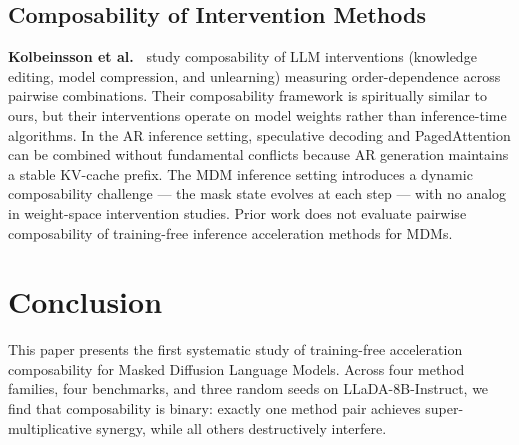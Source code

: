 \documentclass{article}
\begin{document}
\subsection{Composability of Intervention Methods}

\textbf{Kolbeinsson et al.~\cite{kolbeinsson2024composable}} study composability of LLM
interventions (knowledge editing, model compression, and unlearning) measuring order-dependence
across pairwise combinations. Their composability framework is spiritually similar to ours, but
their interventions operate on model weights rather than inference-time algorithms. In the AR
inference setting, speculative decoding and PagedAttention can be combined without fundamental
conflicts because AR generation maintains a stable KV-cache prefix. The MDM inference setting
introduces a dynamic composability challenge --- the mask state evolves at each step --- with no
analog in weight-space intervention studies. Prior work does not evaluate pairwise composability of
training-free inference acceleration methods for MDMs.

\section{Conclusion}
\label{sec:conclusion}

This paper presents the first systematic study of training-free acceleration composability for
Masked Diffusion Language Models. Across four method families, four benchmarks, and three random
seeds on LLaDA-8B-Instruct, we find that composability is binary: exactly one method pair achieves
super-multiplicative synergy, while all others destructively interfere.
\end{document}
